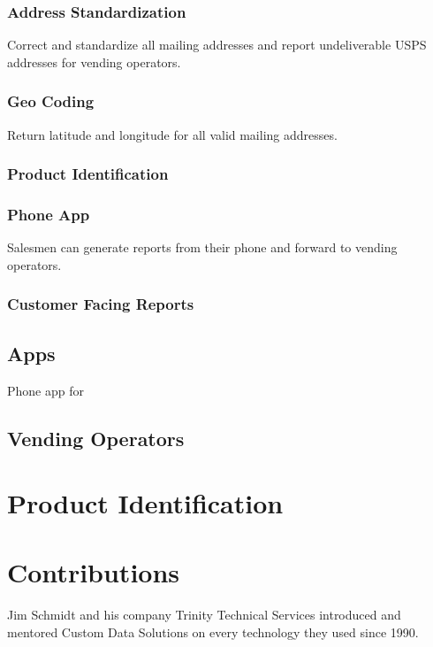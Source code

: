 \documentclass[letterpaper,10pt,english]{sphinxmanual}
\begin{document}
\subsubsection{Address Standardization}
\label{\detokenize{Benefits:address-standardization}}
Correct and standardize all mailing addresses and report undeliverable USPS addresses for vending operators.


\subsubsection{Geo Coding}
\label{\detokenize{Benefits:geo-coding}}
Return latitude and longitude for all valid mailing addresses.


\subsubsection{Product Identification}
\label{\detokenize{Benefits:product-identification}}

\subsubsection{Phone App}
\label{\detokenize{Benefits:phone-app}}
Salesmen can generate reports from their phone and forward to vending operators.


\subsubsection{Customer Facing Reports}
\label{\detokenize{Benefits:customer-facing-reports}}

\subsection{Apps}
\label{\detokenize{Benefits:apps}}
Phone app for


\subsection{Vending Operators}
\label{\detokenize{Benefits:vending-operators}}

\section{Product Identification}
\label{\detokenize{Benefits:id1}}

\section{Contributions}
\label{\detokenize{Contributions:contributions}}\label{\detokenize{Contributions::doc}}
Jim Schmidt and his company Trinity Technical Services introduced and mentored
Custom Data Solutions on every technology they used since 1990.
\end{document}
